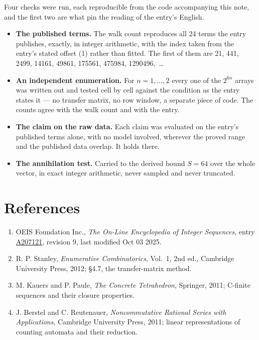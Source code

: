 \documentclass[11pt]{article}
\theoremstyle{definition}
\begin{document}
Four checks were run, each reproducible from the code accompanying this note, and the first two are what pin the reading of the entry's English.

\begin{itemize}

\item {\bfseries The published terms.} The walk count reproduces all 24 terms the entry publishes, exactly, in integer arithmetic, with the index taken from the entry's stated offset (1) rather than fitted. The first of them are 21, 441, 2499, 14161, 49861, 175561, 475984, 1290496,~\dots

\item {\bfseries An independent enumeration.} For $n = 1,\dots,2$ every one of the $2^{6n}$ arrays was written out and tested cell by cell against the condition as the entry states it --- no transfer matrix, no row window, a separate piece of code. The counts agree with the walk count and with the entry.

\item {\bfseries The claim on the raw data.} Each claim was evaluated on the entry's published terms alone, with no model involved, wherever the proved range and the published data overlap. It holds there.

\item {\bfseries The annihilation test.} Carried to the derived bound $S = 64$ over the whole vector, in exact integer arithmetic, never sampled and never truncated.

\end{itemize}

\section{References}

\begin{enumerate}

\item OEIS Foundation Inc., \emph{The On-Line Encyclopedia of Integer Sequences}, entry \href{https://oeis.org/A207121}{A207121}, revision 9, last modified Oct 03 2025.

\item R. P. Stanley, \emph{Enumerative Combinatorics}, Vol.~1, 2nd ed., Cambridge University Press, 2012; \S4.7, the transfer-matrix method.

\item M. Kauers and P. Paule, \emph{The Concrete Tetrahedron}, Springer, 2011; C-finite sequences and their closure properties.

\item J. Berstel and C. Reutenauer, \emph{Noncommutative Rational Series with Applications}, Cambridge University Press, 2011; linear representations of counting automata and their reduction.

\end{enumerate}
\end{document}

